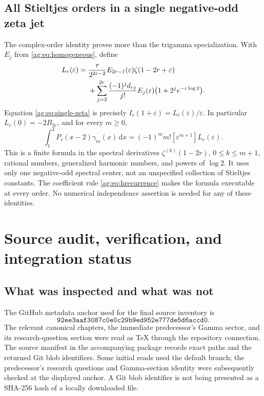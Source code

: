 \documentclass[11pt,letterpaper]{article}
\numberwithin{equation}{section}
\theoremstyle{definition}\newtheorem{definition}[theorem]{Definition}
\theoremstyle{remark}\newtheorem{remark}[theorem]{Remark}
\newcommand{\dd}{\,\mathrm d}\newcommand{\ii}{\mathrm i}
\newcommand{\pin}{92ee3aaf3087c0e0c29b9ed952e777de5d6accd0}
\begin{document}
\subsection{All Stieltjes orders in a single negative-odd zeta jet}
The complex-order identity proves more than the trigamma specialization.
With $E_j$ from \eqref{ag:eq:homogeneous}, define
\begin{align}
 L_r(\varepsilon)={}&
 \frac{r}{2^{2r-2}}E_{2r-1}(\varepsilon)
                              \zeta(1-2r+\varepsilon)\notag\\
 &+\sum_{j=2}^{2r}\frac{(-1)^jd_{rj}}{j!}
                  E_j(\varepsilon)\bigl(1+2^je^{-\varepsilon\log2}\bigr).
 \label{ag:eq:selector-L}
\end{align}
Equation \eqref{ag:eq:single-zeta} is precisely
$I_r(1+\varepsilon)=L_r(\varepsilon)/\varepsilon$.
In particular $L_r(0)=-2B_{2r}$, and for every $m\ge0$,
\begin{equation}\label{ag:eq:selector-Stieltjes}
 \boxed{
 \int_1^3P_r(x-2)\gamma_m(x)\dd x
       =(-1)^m m![\varepsilon^{m+1}]L_r(\varepsilon).}
\end{equation}
This is a finite formula in the spectral derivatives
$\zeta^{(k)}(1-2r)$, $0\le k\le m+1$, rational numbers,
generalized harmonic numbers, and powers of $\log2$. It uses only one
negative-odd spectral center, not an unspecified collection of
Stieltjes constants. The coefficient rule
\eqref{ag:eq:hrecurrence} makes the formula executable at every order.
No numerical independence assertion is needed for any of these identities.



\section{Source audit, verification, and integration status}
\label{ag:sec:audit}

\subsection{What was inspected and what was not}
The GitHub metadata anchor used for the final source inventory is
\[
 \texttt{\pin}.
\]
The relevant canonical chapters, the immediate predecessor's Gamma
sector, and its research-question section were read as TeX through the
repository connection. The source manifest in the accompanying package
records exact paths and the returned Git blob identifiers. Some initial
reads used the default branch; the predecessor's research questions and
Gamma-section identity were subsequently checked at the displayed
anchor. A Git blob identifier is not being presented as a SHA-256 hash
of a locally downloaded file.
\end{document}
